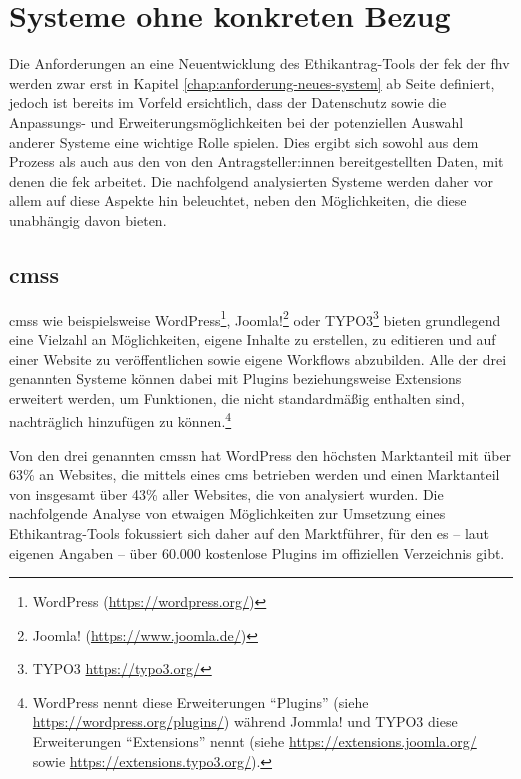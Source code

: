 \documentclass[a4paper,12pt,twoside]{scrreprt}
\begin{document}
\section{Systeme ohne konkreten Bezug}
\label{sec:systeme-ohne-bezug}

Die Anforderungen an eine Neuentwicklung des Ethikantrag-Tools der \ac{fek} der \ac{fhv} werden zwar erst in Kapitel \ref{chap:anforderung-neues-system} ab Seite \pageref{chap:anforderung-neues-system} definiert, jedoch ist bereits im Vorfeld ersichtlich, dass der Datenschutz sowie die Anpassungs- und Erweiterungsmöglichkeiten bei der potenziellen Auswahl anderer Systeme eine wichtige Rolle spielen. Dies ergibt sich sowohl aus dem Prozess als auch aus den von den Antragsteller:innen bereitgestellten Daten, mit denen die \acl{fek} arbeitet. Die nachfolgend analysierten Systeme werden daher vor allem auf diese Aspekte hin beleuchtet, neben den Möglichkeiten, die diese unabhängig davon bieten.

\subsection{\aclp{cms}}
\label{sub-sec:cms-syteme}

\acp{cms} wie beispielsweise WordPress\footnote{WordPress (\url{https://wordpress.org/})}, Joomla!\footnote{Joomla! (\url{https://www.joomla.de/})} oder TYPO3\footnote{TYPO3 \url{https://typo3.org/}} bieten grundlegend eine Vielzahl an Möglichkeiten, eigene Inhalte zu erstellen, zu editieren und auf einer Website zu veröffentlichen sowie eigene Workflows abzubilden. \cite{oracle_corporation_who_2022} Alle der drei genannten Systeme können dabei mit Plugins beziehungsweise Extensions erweitert werden, um Funktionen, die nicht standardmäßig enthalten sind, nachträglich hinzufügen zu können.\footnote{WordPress nennt diese Erweiterungen \enquote{Plugins} (siehe \url{https://wordpress.org/plugins/}) während Jommla! und TYPO3 diese Erweiterungen \enquote{Extensions} nennt (siehe \url{https://extensions.joomla.org/} sowie \url{https://extensions.typo3.org/}).}

\medskip

Von den drei genannten \aclp{cms}n hat WordPress den höchsten Marktanteil mit über 63\% an Websites, die mittels eines \ac{cms} betrieben werden und einen Marktanteil von insgesamt über 43\% aller Websites, die von \cite{q-success_di_gelbmann_gmbh_usage_2023} analysiert wurden. Die nachfolgende Analyse von etwaigen Möglichkeiten zur Umsetzung eines Ethikantrag-Tools fokussiert sich daher auf den Marktführer, für den es -- laut eigenen Angaben \cite{wordpress_foundation_wordpress_2023} -- über 60.000 kostenlose Plugins im offiziellen Verzeichnis gibt.
\end{document}
